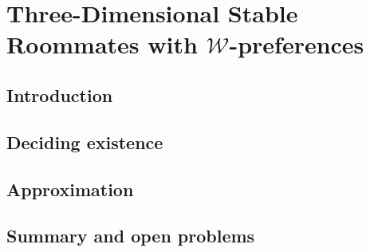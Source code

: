 \chapter{Three-Dimensional Stable Roommates with \texorpdfstring{$\mathscr{W}$}{W}-preferences}
\label{c:threed_sr_w}

\section{Introduction}
\label{sec:threed_sr_w_intro}


\section{Deciding existence}
\label{sec:threed_sr_w_hardness}


% 

% 

\section{Approximation}
\label{sec:threed_sr_w_approximation}


\section{Summary and open problems}
\label{sec:threed_sr_w_conclusion}
